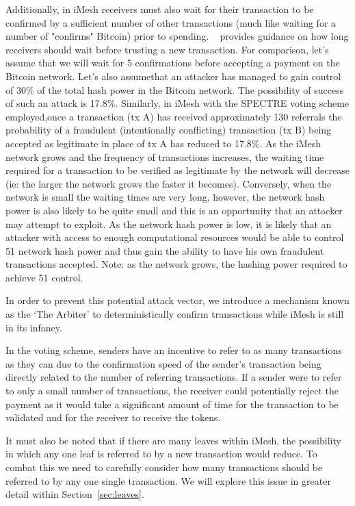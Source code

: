 \documentclass[a4paper,10pt,twocolumn]{article}
\begin{document}
 Additionally, in iMesh receivers must also wait for their transaction to be confirmed by a sufficient number of other transactions 
 (much like waiting for a number of "confirms" Bitcoin) prior to spending. ~\cite{spectre} provides guidance on how long receivers 
 should wait before trusting a new transaction. For comparison, let's assume that we will wait for 5 confirmations before accepting a 
 payment on the Bitcoin network. Let's also assumethat an attacker has managed to gain control of 30\% of the total hash power in the 
 Bitcoin network. The possibility of success of such an attack is 17.8\%\cite{btc}. Similarly, in iMesh with the SPECTRE voting scheme 
 employed,once a transaction (tx A) has received approximately 130 referrals the probability of a fraudulent (intentionally conflicting) 
 transaction (tx B) being accepted as legitimate in place of tx A has reduced to 17.8\%. As the iMesh network grows and the frequency of 
 transactions increases, the waiting time required for a transaction to be verified as legitimate by the network will decrease (ie: the 
 larger the network grows the faster it becomes). Conversely, when the network is small the waiting times are very long, however, the 
 network hash power is also likely to be quite small and this is an opportunity that an attacker may attempt to exploit. As the network 
 hash power is low, it is likely that an attacker with access to enough computational resources would be able to control 51%
 network hash power and thus gain the ability to have his own fraudulent transactions accepted. Note: as the network grows, the hashing 
 power required to achieve 51%
 control.
 
In order to prevent this potential attack vector, we introduce a mechanism known as the `The Arbiter' to deterministically confirm transactions while iMesh is still in its infancy.

In the voting scheme, senders have an incentive to refer to as many transactions as they can due to the confirmation speed of the 
sender's transaction being directly related to the number of referring transactions. If a sender were to refer to only a small number of 
transactions, the receiver could potentially reject the payment as it would take a significant amount of time for the transaction to be 
validated and for the receiver to receive the tokens.

It must also be noted that if there are many leaves within iMesh, the possibility in which any one leaf is referred to by a new 
transaction would reduce. To combat this we need to carefully consider how many transactions should be referred to by any one single 
transaction. We will explore this issue in greater detail within Section~\ref{sec:leaves}.
\end{document}
